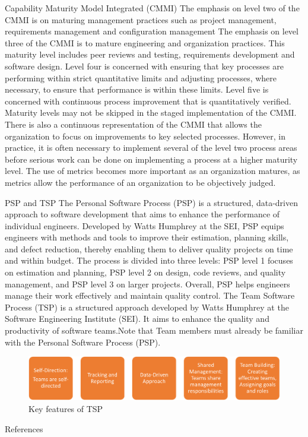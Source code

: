 \documentclass[final]{beamer}
\newlength{\colwidth}
\begin{document}
\begin{frame}[t]
\begin{columns}[t]
\begin{column}{\colwidth}
	\begin{block}{Capability Maturity Model Integrated (CMMI)}
	The emphasis on level two of the CMMI is on maturing management practices such as project management, requirements management and conﬁguration management The emphasis on level three of the CMMI is to mature engineering and organization practices. This maturity level includes peer reviews and testing, requirements development and software design. Level four is concerned with ensuring that key processes are performing within strict quantitative limits and adjusting processes, where necessary, to ensure that performance is within these limits. Level ﬁve is concerned with continuous process improvement that is quantitatively veriﬁed.\\
	Maturity levels may not be skipped in the staged implementation of the CMMI. There is also a continuous representation of the CMMI that allows the organization to focus on improvements to key selected processes. However, in practice, it is often necessary to implement several of the level two process areas before serious work can be done on implementing a process at a higher maturity level. The use of metrics \cite{FE95,gilb_77} becomes more important as an organization matures, as metrics allow the performance of an organization to be objectively judged.
\end{block}
\begin{exampleblock}{PSP and TSP}
	The Personal Software Process (PSP) is a structured, data-driven approach to software development that aims to enhance the performance of individual engineers. Developed by Watts Humphrey at the SEI, PSP equips engineers with methods and tools to improve their estimation, planning skills, and defect reduction, thereby enabling them to deliver quality projects on time and within budget. The process is divided into three levels: PSP level 1 focuses on estimation and planning, PSP level 2 on design, code reviews, and quality management, and PSP level 3 on larger projects. Overall, PSP helps engineers manage their work effectively and maintain quality control.
	The Team Software Process (TSP) is a structured approach developed by Watts Humphrey at the Software Engineering Institute (SEI). It aims to enhance the quality and productivity of software teams.Note that Team members must already be familiar with the Personal Software Process (PSP).
	\begin{figure}
		\includegraphics{images/Diag2.png}
		\caption{Key features of TSP}
	\end{figure}
\end{exampleblock}
  \begin{block}{References}
    \nocite{*}
    \footnotesize{}
  \end{block}


\end{column}
\end{columns}
\end{frame}
\end{document}

